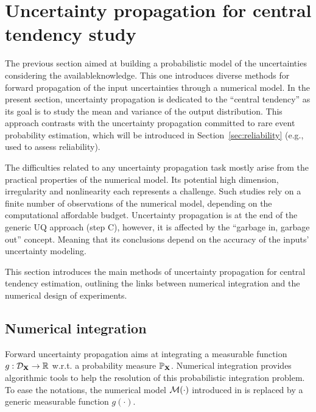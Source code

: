 \section{Uncertainty propagation for central tendency study} \label{sec:central_propagation}
The previous section aimed at building a probabilistic model of the uncertainties considering the availableknowledge. 
This one introduces diverse methods for forward propagation of the input uncertainties through a numerical model. 
In the present section, uncertainty propagation is dedicated to the ``central tendency'' as its goal is to study the mean and variance of the output distribution. 
This approach contrasts with the uncertainty propagation committed to rare event probability estimation, which will be introduced in Section~\ref{sec:reliability} (e.g., used to assess reliability). 

The difficulties related to any uncertainty propagation task mostly arise from the practical properties of the numerical model. 
Its potential high dimension, irregularity and nonlinearity each represents a challenge. 
Such studies rely on a finite number of observations of the numerical model, depending on the computational affordable budget.  
Uncertainty propagation is at the end of the generic UQ approach (step C), however, it is affected by the ``garbage in, garbage out'' concept. 
Meaning that its conclusions depend on the accuracy of the inputs' uncertainty modeling. 

This section introduces the main methods of uncertainty propagation for central tendency estimation, 
outlining the links between numerical integration and the numerical design of experiments. 


\subsection{Numerical integration}
Forward uncertainty propagation aims at integrating a measurable function $g: \mathcal{D}_{{\bf X}} \rightarrow \mathbb{R}$ w.r.t. a probability measure $\mathbb{P}_{{\bf X}}$. 
Numerical integration provides algorithmic tools to help the resolution of this probabilistic integration problem. 
To ease the notations, the numerical model $\mathcal{M}(\cdot)$ introduced in  is replaced by a generic measurable function $g(\cdot)$.

